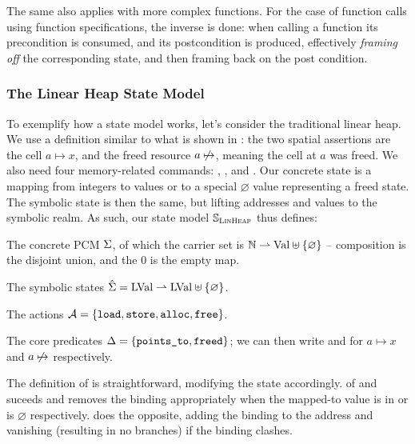 The same also applies with more complex functions. For the case of function calls using function specifications, the inverse is done: when calling a function its precondition is consumed, and its postcondition is produced, effectively \emph{framing off} the corresponding state, and then framing back on the post condition.

\subsubsection{The Linear Heap State Model}

To exemplify how a state model works, let's consider the traditional linear heap. We use a definition similar to what is shown in \cite{isl}: the two spatial assertions are the cell $a\mapsto x$, and the freed resource $a\not\mapsto$, meaning the cell at $a$ was freed. We also need four memory-related commands: \load, \store, \alloc{} and \free{}. Our concrete state is a mapping from integers to values or to a special $\varnothing$ value representing a freed state. The symbolic state is then the same, but lifting addresses and values to the symbolic realm. As such, our state model $\mathbb S_{\textsc{LinHeap}}$ thus defines: \begin{compactitem}
 \item The concrete PCM $\Sigma$, of which the carrier set is $\mathbb N\rightharpoonup \text{Val} \uplus \{\varnothing\}$ -- composition is the disjoint union, and the $0$ is the empty map.
 \item The symbolic states $\hat{\Sigma} = \text{LVal} \rightharpoonup \text{LVal} \uplus\{\varnothing\}$.
 \item The actions ${\cal{A}}=\{\texttt{load},\texttt{store},\texttt{alloc},\texttt{free}\}$.
 \item The core predicates $\Delta=\{\texttt{points\_to}, \texttt{freed}\}$; we can then write  and  for $a\mapsto x$ and $a\not\mapsto$ respectively.
 \end{compactitem}
 
 The definition of \execac{} is straightforward, modifying the state accordingly. \consume{} of \pointsto{} and \freedP{} suceeds and removes the binding appropriately when the mapped-to value is in \LVal{} or is $\varnothing$ respectively. \produce{} does the opposite, adding the binding to the address and vanishing (resulting in no branches) if the binding clashes.
 
